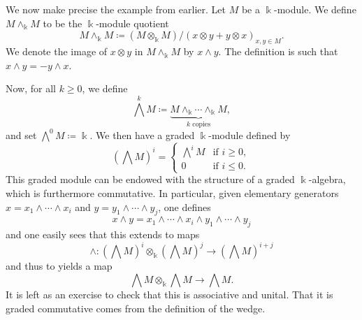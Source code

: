 \begin{example}
	We now make precise the example from earlier. Let \(M\) be a \(\Bbbk\)-module. We define \(M\wedge_\Bbbk M\) to be the
	\(\Bbbk\)-module quotient
	\[ M\wedge_\Bbbk M \coloneq (M\otimes_\Bbbk M)/(x\otimes y + y\otimes x)_{x,y\in M}. \]
	We denote the image of \(x\otimes y\) in \(M\wedge_\Bbbk M\) by \(x\wedge y\). The definition is such that \(x\wedge y = -y\wedge x\).

	Now, for all \(k\geq 0\), we define
	\[ \bigwedge^kM \coloneq \underbrace{M\wedge_\Bbbk \cdots \wedge_\Bbbk M}_{k\text{ copies}}, \]
	and set \(\bigwedge^0M \coloneq \Bbbk\). We then have a graded \(\Bbbk\)-module defined by
	\[ \left(\bigwedge M\right)^i = \begin{cases}
		\bigwedge^i M & \text{if }i\geq 0, \\
		0 & \text{if }i \leq 0.
	\end{cases} \]
	This graded module can be endowed with the structure of a graded \(\Bbbk\)-algebra, which is furthermore commutative. In particular, given
	elementary generators \(x = x_1\wedge \cdots \wedge x_i\) and \(y = y_1\wedge \cdots \wedge y_j\), one defines
	\[ x\wedge y = x_1\wedge \cdots \wedge x_i \wedge y_1 \wedge \cdots \wedge y_j \]
	and one easily sees that this extends to maps
	\[ \wedge\!: \left(\bigwedge M\right)^i \otimes_\Bbbk \left(\bigwedge M\right)^j \to \left(\bigwedge M\right)^{i+j} \]
	and thus to yields a map
	\[ \bigwedge M \otimes_\Bbbk \bigwedge M \to \bigwedge M. \]
	It is left as an exercise to check that this is associative and unital. That it is graded commutative comes from the definition of the wedge.
\end{example}
